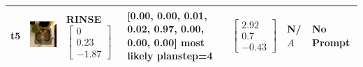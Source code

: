 \begin{longtable}{| V{0.8cm} | V{2.6cm} | V{1.6cm} | V{2.1cm} | V{1.55cm} | V{1.6cm} | V{3.2cm} |}
t5 &
\includegraphics[width=\linewidth]{fig/system/_fast2-rinse_.jpg} &
RINSE
\linebreak\linebreak
$\begin{bmatrix}
0 \\
0.23 \\
-1.87
\end{bmatrix}$ &
[0.00, 0.00, 0.01, 0.02, 0.97, 0.00, 0.00, 0.00] most likely planstep=4 &
$\begin{bmatrix}
2.92 \\
0.7 \\
-0.43
\end{bmatrix}$ &
N/$A$ &
No Prompt
\\ \hline



\end{longtable}
